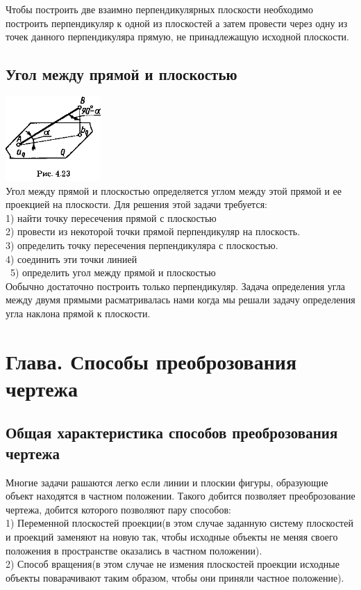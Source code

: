\documentclass[a4paper, 12pt]{article}
\begin{document}
Чтобы построить две взаимно перпендикулярных плоскости необходимо построить перпендикуляр к одной из плоскостей а затем провести через одну из точек данного перпендикуляра  прямую, не принадлежащую исходной плоскости.

\subsection{Угол между прямой и плоскостью}
\quad \quad \quad \quad \quad \quad \quad\includegraphics{img/461.png}\\
Угол между прямой и плоскостью определяется углом между этой прямой и ее проекцией на плоскости. Для решения этой задачи требуется:\\
1) найти точку пересечения прямой с плоскостью\\
2) провести из некоторой точки прямой перпендикуляр на плоскость.\\
3) определить точку пересечения перпендикуляра с плоскостью.\\
4) соединить эти точки линией\\\
5) определить угол между прямой и плоскостью\\
Ообычно достаточно построить только перпендикуляр. Задача определения угла между двумя прямыми расматривалась нами когда мы решали задачу определения угла наклона прямой к плоскости.

\section{Глава. Способы преоброзования чертежа}
\subsection{Общая характеристика способов преоброзования чертежа}

Многие задачи рашаются легко если линии и плоскии фигуры, образующие объект находятся в частном положении. Такого добится позволяет преоброзование чертежа, добится которого позволяют пару способов:\\
1) Переменной плоскостей проекции(в этом случае заданную систему плоскостей и проекций заменяют на новую так, чтобы исходные объекты не меняя своего положения в пространстве оказались в частном положении).\\
2) Способ вращения(в этом случае не измения плоскостей проекции исходные объекты поварачивают таким образом, чтобы они приняли частное положение).\\
\end{document}
